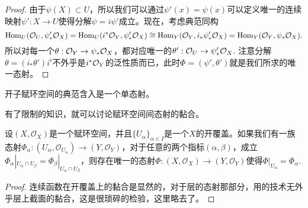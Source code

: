 \begin{proof}
由于$\psi(X)\subset U$，所以我们可以通过$\psi'(x)=\psi(x)$可以定义唯一的连续映射$\psi':X\to U$使得分解$\psi=i\psi'$成立。现在，考虑典范同构
\[
	\operatorname{Hom}_{U}(\mathcal{O}_U,\psi'_*\mathcal{O}_X)=\operatorname{Hom}_{U}(i^*\mathcal{O}_Y,\psi'_*\mathcal{O}_X)\cong \operatorname{Hom}_{Y}(\mathcal{O}_Y,i_*\psi'_*\mathcal{O}_X)=\operatorname{Hom}_{Y}(\mathcal{O}_Y,\psi_*\mathcal{O}_X).
\]
所以对每一个$\theta:\mathcal{O}_Y\to \psi_*\mathcal{O}_X$，都对应唯一的$\theta':\mathcal{O}_U\to \psi'_*\mathcal{O}_X$. 注意分解$\theta=(i_*\theta')i^\flat$不外乎是$i^*\mathcal{O}_Y$的泛性质而已，此时$\Phi=(\psi',\theta')$就是我们所求的唯一态射。
\end{proof}

\begin{coro}\label{coro:1.21}
开子赋环空间的典范含入是一个单态射。
\end{coro}

有了限制的知识，就可以讨论赋环空间间态射的黏合。

\begin{pro}
设$(X,\mathcal{O}_X)$是一个赋环空间，并且$\{U_\alpha\}_{\alpha\in I}$是一个$X$的开覆盖。如果我们有一族态射$\Phi_\alpha:(U_{\alpha},\mathcal{O}_{U_{\alpha}})\to (Y,\mathcal{O}_Y)$，对于任意的两个指标$(\alpha,\beta)$，成立$\Phi_\alpha|_{U_{\alpha}\cap U_{\beta}}=\Phi_\beta|_{U_{\alpha}\cap U_{\beta}}$，则存在唯一的态射$\Phi:(X,\mathcal{O}_{X})\to (Y,\mathcal{O}_Y)$使得$\Phi|_{U_{\alpha}}=\Phi_\alpha$.
\end{pro}

\begin{proof} 连续函数在开覆盖上的黏合是显然的，对于层的态射那部分，用的技术无外乎层上截面的黏合，这是很琐碎的检验，这里略去了。\end{proof}




